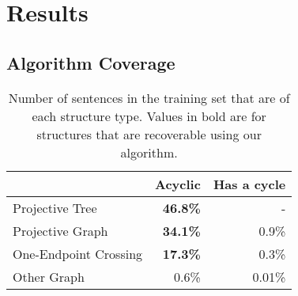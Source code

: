 
\section{Results}

\subsection{Algorithm Coverage}

\begin{table}
  \centering
  \begin{tabular}{|lrr|}
    \hline
      & Acyclic & Has a cycle \\
    \hline
    \hline
    Projective Tree & \textbf{46.8\%} & - \\
    Projective Graph & \textbf{34.1\%} & 0.9\% \\
    One-Endpoint Crossing & \textbf{17.3\%} & 0.3\% \\
    Other Graph & 0.6\% & 0.01\% \\
    \hline
  \end{tabular}
  \caption{\label{tab:structures}
    Number of sentences in the training set that are of each structure type.
    Values in bold are for structures that are recoverable using our algorithm.
  }
\end{table}

